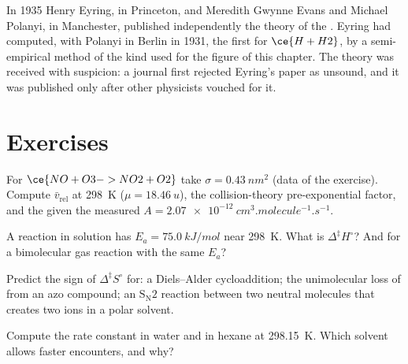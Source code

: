 \begin{history}
In 1935 Henry Eyring, in Princeton, and Meredith Gwynne Evans and Michael
Polanyi, in Manchester, published independently the theory of the . Eyring had computed, with Polanyi in Berlin in 1931, the first
 for $\ce{H + H2}$, by a semi-empirical method of the kind used
for the figure of this chapter. The theory was received with suspicion: a
journal first rejected Eyring's paper as unsound, and it was published only
after other physicists vouched for it.
\end{history}

\section{Exercises}

\begin{exercise}[$\star$]\label{exo:b3:rate-theories:1}
For $\ce{NO + O3 -> NO2 + O2}$ take $\sigma = \qty{0.43}{nm^2}$ (data of the exercise). Compute $\bar v_{\mathrm{rel}}$
at \qty{298}{K} ($\mu = \qty{18.46}{u}$), the collision-theory pre-exponential factor, and the
 given the measured $A = \qty{2.07e-12}{cm^3.molecule^{-1}.s^{-1}}$.
\end{exercise}

\begin{exercise}[$\star$]\label{exo:b3:rate-theories:2}
A reaction in solution has $E_a = \qty{75.0}{kJ/mol}$ near \qty{298}{K}. What is $\Delta^{\ddagger}H^\circ$? And
for a bimolecular gas reaction with the same $E_a$?
\end{exercise}

\begin{exercise}[$\star$]\label{exo:b3:rate-theories:3}
Predict the sign of $\Delta^{\ddagger}S^\circ$ for: a Diels--Alder cycloaddition; the
unimolecular loss of  from an azo compound; an $\mathrm{S_N2}$ reaction between two
neutral molecules that creates two ions in a polar solvent.
\end{exercise}

\begin{exercise}[$\star$]\label{exo:b3:rate-theories:4}
Compute the  rate constant in water and in hexane at
\qty{298.15}{K}. Which solvent allows faster encounters, and why?
\end{exercise}

